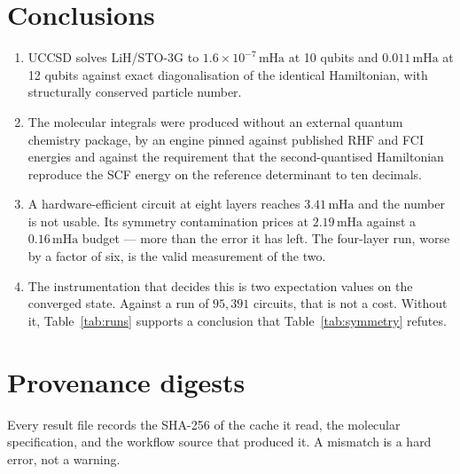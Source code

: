 \documentclass[11pt,a4paper]{article}
\newcommand{\mHa}{\ensuremath{\,\mathrm{mHa}}}
\begin{document}
\section{Conclusions}

\begin{enumerate}[leftmargin=1.4em,itemsep=0.25em]

\item UCCSD solves LiH/STO-3G to $1.6\times10^{-7}\mHa$ at 10 qubits and
  $0.011\mHa$ at 12 qubits against exact diagonalisation of the identical
  Hamiltonian, with structurally conserved particle number.

\item The molecular integrals were produced without an external quantum
  chemistry package, by an engine pinned against published RHF and FCI energies
  and against the requirement that the second-quantised Hamiltonian reproduce
  the SCF energy on the reference determinant to ten decimals.

\item A hardware-efficient circuit at eight layers reaches $3.41\mHa$ and the
  number is not usable. Its symmetry contamination prices at $2.19\mHa$ against
  a $0.16\mHa$ budget --- more than the error it has left. The four-layer run,
  worse by a factor of six, is the valid measurement of the two.

\item The instrumentation that decides this is two expectation values on the
  converged state. Against a run of $95{,}391$ circuits, that is not a cost.
  Without it, Table~\ref{tab:runs} supports a conclusion that
  Table~\ref{tab:symmetry} refutes.

\end{enumerate}

\appendix

\section{Provenance digests}

Every result file records the SHA-256 of the cache it read, the molecular
specification, and the workflow source that produced it. A mismatch is a hard
error, not a warning.
\end{document}
